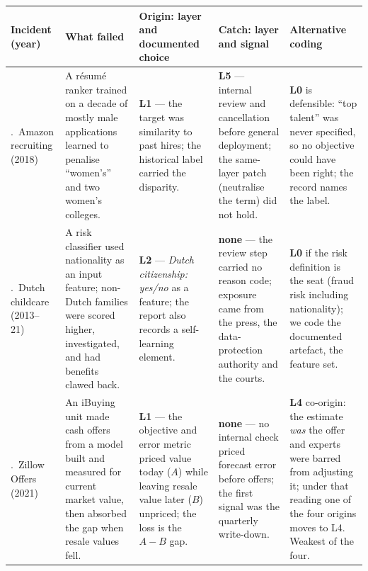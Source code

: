 \begin{table}[H]
\centering
\footnotesize
\setlength{\tabcolsep}{3.5pt}
\renewcommand{\arraystretch}{1.05}
\begin{tabular}{@{}>{\raggedright\arraybackslash}p{2.3cm}
                  >{\raggedright\arraybackslash}p{3.0cm}
                  >{\raggedright\arraybackslash}p{3.5cm}
                  >{\raggedright\arraybackslash}p{3.1cm}
                  >{\raggedright\arraybackslash}p{3.1cm}@{}}
\toprule
Incident (year) & What failed & Origin: layer and documented choice & Catch: layer and signal & Alternative coding \\
\midrule
1.\ Amazon recruiting (2018)~\cite{reuters2018amazon} &
A r\'esum\'e ranker trained on a decade of mostly male applications learned to penalise
``women's'' and two women's colleges. &
\textbf{L1} --- the target was similarity to past hires; the historical label carried the
disparity. &
\textbf{L5} --- internal review and cancellation before general deployment; the same-layer patch
(neutralise the term) did not hold. &
\textbf{L0} is defensible: ``top talent'' was never specified, so no objective could have been
right; the record names the label. \\
\addlinespace[2pt]
2.\ Dutch childcare (2013--21)~\cite{amnesty2021xenophobic} &
A risk classifier used nationality as an input feature; non-Dutch families were scored higher,
investigated, and had benefits clawed back. &
\textbf{L2} --- \emph{Dutch citizenship: yes/no} as a feature; the report also records a
self-learning element. &
\textbf{none} --- the review step carried no reason code; exposure came from the press, the
data-protection authority and the courts. &
\textbf{L0} if the risk definition is the seat (fraud risk including nationality); we code the
documented artefact, the feature set. \\
\addlinespace[2pt]
3.\ Zillow Offers (2021)~\cite{zillow2021winddown} &
An iBuying unit made cash offers from a model built and measured for current market value, then
absorbed the gap when resale values fell. &
\textbf{L1} --- the objective and error metric priced value today ($A$) while leaving resale value
later ($B$) unpriced; the loss is the $A-B$ gap. &
\textbf{none} --- no internal check priced forecast error before offers; the first signal was the
quarterly write-down. &
\textbf{L4} co-origin: the estimate \emph{was} the offer and experts were barred from adjusting
it; under that reading one of the four origins moves to L4. Weakest of the four. \\

\end{tabular}
\end{table}
